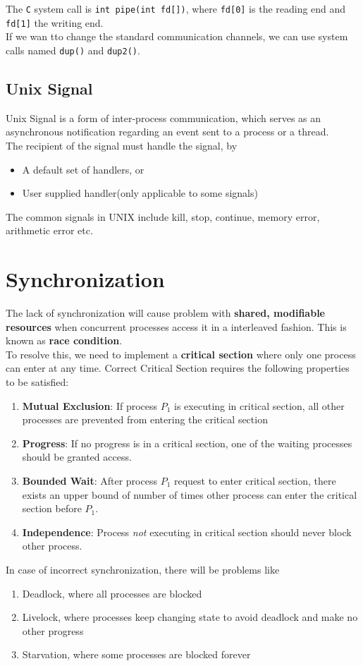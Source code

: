 \documentclass[12pt]{article}
\theoremstyle{definition}
\begin{document}
The \texttt{C} system call is \texttt{int pipe(int fd[])}, where \texttt{fd[0]} is the reading end and \texttt{fd[1]} the writing end.\\

If we wan tto change the standard communication channels, we can use system calls named \texttt{dup()} and \texttt{dup2()}.
\subsection{Unix Signal}
Unix Signal is a form of inter-process communication, which serves as an asynchronous notification regarding an event sent to a process or a thread.\\
The recipient of the signal must handle the signal, by
\begin{itemize}
  \item A default set of handlers, or
  \item User supplied handler(only applicable to some signals)
\end{itemize}
The common signals in UNIX include kill, stop, continue, memory error, arithmetic error etc.

\section{Synchronization}
The lack of synchronization will cause problem with \textbf{shared, modifiable resources} when concurrent processes access it in a interleaved fashion. This is known as \textbf{race condition}.\\
To resolve this, we need to implement a \textbf{critical section} where only one process can enter at any time. Correct Critical Section requires the following properties to be satisfied:
\begin{enumerate}
  \item \textbf{Mutual Exclusion}: If process $P_1$ is executing in critical section, all other processes are prevented from entering the critical section
  \item \textbf{Progress}: If no progress is in a critical section, one of the waiting processes should be granted access.
  \item \textbf{Bounded Wait}: After process $P_1$ request to enter critical section, there exists an upper bound of number of times other process can enter the critical section before $P_1$.
  \item \textbf{Independence}: Process \textit{not} executing in critical section should never block other process. 
\end{enumerate}
In case of incorrect synchronization, there will be problems like
\begin{enumerate}
  \item Deadlock, where all processes are blocked
  \item Livelock, where processes keep changing state to avoid deadlock and make no other progress
  \item Starvation, where some processes are blocked forever
\end{enumerate}
\end{document}
